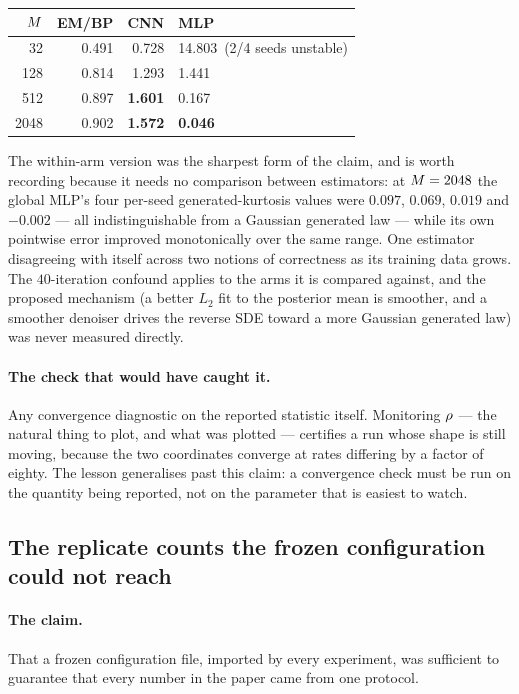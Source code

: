 \begin{center}
\begin{tabular}{@{}rrrl@{}}
\toprule
$M$ & EM/BP & CNN & MLP \\
\midrule
32   & 0.491 & 0.728 & 14.803\ (2/4 seeds unstable) \\
128  & 0.814 & 1.293 & 1.441 \\
512  & 0.897 & \textbf{1.601} & 0.167 \\
2048 & 0.902 & \textbf{1.572} & \textbf{0.046} \\
\bottomrule
\end{tabular}
\end{center}

\noindent The within-arm version was the sharpest form of the claim, and is worth recording
because it needs no comparison between estimators: at $M=2048$ the global MLP's four
per-seed generated-kurtosis values were $0.097$, $0.069$, $0.019$ and $-0.002$ --- all
indistinguishable from a Gaussian generated law --- while its own pointwise error improved
monotonically over the same range. One estimator disagreeing with itself across two notions
of correctness as its training data grows. The $40$-iteration confound applies to the arms it
is compared against, and the proposed mechanism (a better $L_2$ fit to the posterior mean is
smoother, and a smoother denoiser drives the reverse SDE toward a more Gaussian generated
law) was never measured directly.

\paragraph{The check that would have caught it.} Any convergence diagnostic on the reported
statistic itself. Monitoring $\rho$ --- the natural thing to plot, and what was plotted ---
certifies a run whose shape is still moving, because the two coordinates converge at rates
differing by a factor of eighty. The lesson generalises past this claim: a convergence check
must be run on the quantity being reported, not on the parameter that is easiest to watch.

\subsection{The replicate counts the frozen configuration could not reach}
\label{sec:corr-replicates}

\paragraph{The claim.} That a frozen configuration file, imported by every experiment, was
sufficient to guarantee that every number in the paper came from one protocol.

